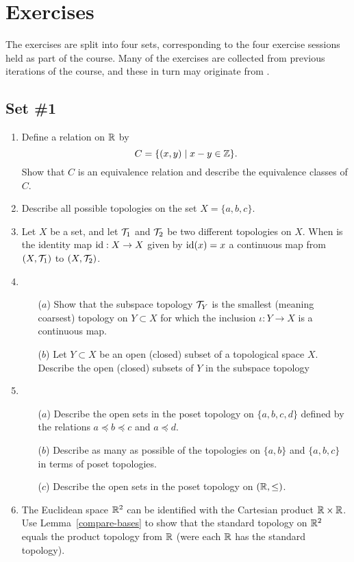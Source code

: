 \section{Exercises}
The exercises are split into four sets, corresponding to the four exercise sessions held as part of the course. Many of the exercises are collected from previous iterations of the course, and these in turn may originate from \cite{Mun}.

\subsection{Set \#1}

\begin{enumerate}
  \item Define a relation on $\mathbb{R}$ by
    \[
      C=\{(x,y) \mid x - y \in \mathbb{Z} \}.
    \]
    Show that $C$ is an equivalence relation and describe the equivalence classes of $C$.
  \item Describe all possible topologies on the set $X = \{a,b,c\}$.
  \item Let $X$ be a set, and let $\mathcal{T}_1$ and $\mathcal{T}_2$ be two different topologies on $X$. When is the identity map $\mathrm{id} : X \to X$ given by $\mathrm{id}(x) = x$ a continuous map from $(X,\mathcal{T}_1)$ to $(X,\mathcal{T}_2)$.
  \item \begin{itemize}
		\item[($a$)] Show that the subspace topology $\mathcal{T}_Y$ is the smallest (meaning coarsest) topology on $Y\subset X$ for which the inclusion $\iota:Y \rightarrow X$ is a continuous map.
		\item[($b$)] Let $Y\subset X$ be an open (closed) subset of a topological space $X$. Describe the open (closed) subsets of $Y$ in the subspace topology
	\end{itemize}
  \item \begin{itemize}
		\item[($a$)] Describe the open sets in the poset topology on $\{a,b,c,d\}$ defined by the relations $a\preceq b\preceq c$ and $a\preceq d$.
		\item[($b$)] Describe as many as possible of the topologies on $\{a,b\}$ and $\{a,b,c\}$ in terms of poset topologies.
		\item[($c$)] Describe the open sets in the poset topology on $(\mathbb{R},\leq)$.
	\end{itemize}
	
  \item The Euclidean space $\mathbb{R}^2$ can be identified with the Cartesian product $\mathbb{R} \times \mathbb{R}$. Use Lemma~\ref{compare-bases} to show that the standard topology on $\mathbb{R}^2$ equals the product topology from $\mathbb{R}$ (were each $\mathbb{R}$ has the standard topology).
  

\end{enumerate}

